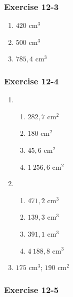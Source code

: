 {\begin{multicols}{3}
\subsubsection*{Exercise 12-3} %

\begin{enumerate}[noitemsep, label=\textbf{\arabic*}. ] 
\item $420$ cm$^3$
\item $500$ cm$^3$
\item $785,4$ cm$^3$
\end{enumerate}

\subsubsection*{Exercise 12-4} %

\begin{enumerate}[noitemsep, label=\textbf{\arabic*}. ] 
\item %
    \begin{enumerate}[noitemsep, label=\textbf{\alph*}. ]
	  \item $282,7$ cm$^2$
	  \item $180$ cm$^2$
	  \item  $45,6$ cm$^2$
	  \item $1~256,6$ cm$^2$
    \end{enumerate}
\item %
    \begin{enumerate}[noitemsep, label=\textbf{\alph*}. ]
	  \item $471,2$ cm$^3$
	  \item $139,3$ cm$^3$
	  \item  $391,1$ cm$^3$
	  \item $4~188,8$ cm$^3$
    \end{enumerate}
\item %
 $175$ cm$^3$; $190$ cm$^2$
    \end{enumerate}


\subsubsection*{Exercise 12-5} %


\end{multicols}}
